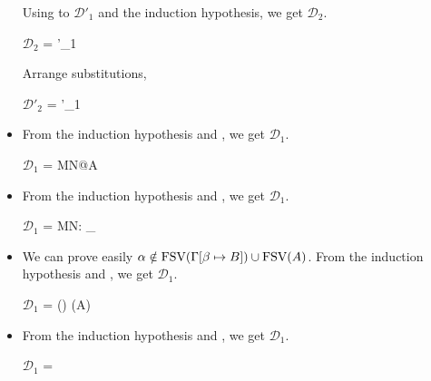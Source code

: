 \begin{itemize}
	      Using \QApp to $\mathcal{D}'_1$ and the induction hypothesis, we get $\mathcal{D}_2$.
	      	      	      	      
	      $\mathcal{D}_2$ = 
	      {'_1 \andalso {}}
	      	      	      	      
	      Arrange substitutions,
	      	      	      	      
	      $\mathcal{D}'_2$ = 
	      {'_1 \andalso {}}
	      	      	      	      
	\item \QTB
	      	      	      	      
	      From the induction hypothesis and \QTB, we get $\mathcal{D}_1$.
	      	      	      	      
	      $\mathcal{D}_1$ = 
	      {\GGV M\SB \E N\SB @A\alpha}
	      	      	      	      
	\item \QTBL
	      	      	      	      
	      From the induction hypothesis and \QTBL, we get $\mathcal{D}_1$.
	      	      	      	      
	      $\mathcal{D}_1$ = 
	      {\GGV M\SB \E N\SB : \TW_\alpha \tau@A}
	      	      	      	      
	\item \QGen
	      	      	      	      
	      We can prove easily $\alpha \notin \text{FSV}(\Gamma[\beta \mapsto B]) \cup \text{FSV}(A)$.
	      From the induction hypothesis and \QGen, we get $\mathcal{D}_1$.
	      	      	      	      
	      $\mathcal{D}_1$ = 
	      { \andalso \alpha \notin \FTV(\GG) \cup \FTV(A)}
	      	      	      	      
	\item \QIns
	      	      	      	      
	      From the induction hypothesis and \QIns, we get $\mathcal{D}_1$.
	      	      	      	      
	      $\mathcal{D}_1$ = 
	      {}
	      	      	      	      

\end{itemize}
